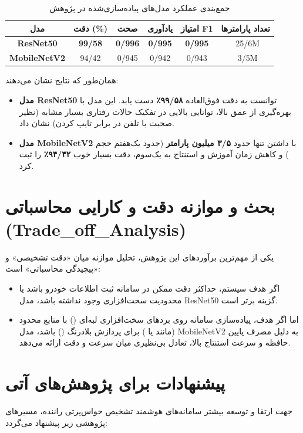 \documentclass{report}
\begin{document}
 			\begin{table}[H]
 				\centering
 				\caption{جمع‌بندی عملکرد مدل‌های پیاده‌سازی‌شده در پژوهش}
 				\label{tab:final_summary}
 				\small
 				\begin{tabular}{cccccc}
 					\toprule
 					\textbf{مدل} & \textbf{دقت (\%)} & \textbf{صحت} & \textbf{یادآوری} & \textbf{امتیاز F1} & \textbf{تعداد پارامترها} \\
 					\midrule
 					\textbf{ResNet50} & \textbf{99/58} & \textbf{0/996} & \textbf{0/995} & \textbf{0/995} & ~25/6M \\
 					\textbf{MobileNetV2} & 94/42 & 0/945 & 0/942 & 0/943 & ~3/5M \\
 					\bottomrule
 				\end{tabular}
 			\end{table}
 			
 			همان‌طور که نتایج نشان می‌دهند:
 			\begin{itemize}
 				\item \textbf{مدل ResNet50} توانست به دقت فوق‌العاده \textbf{۹۹/۵۸٪} دست یابد. این مدل با بهره‌گیری از عمق بالا، توانایی بالایی در تفکیک حالات رفتاری بسیار مشابه (نظیر صحبت با تلفن در برابر تایپ کردن) نشان داد.
 				\item \textbf{مدل MobileNetV2} با داشتن تنها حدود \textbf{۳/۵ میلیون پارامتر} (حدود یک‌هفتم حجم ) و کاهش زمان آموزش و استنتاج به یک‌سوم، دقت بسیار خوب \textbf{۹۴/۴۲٪} را ثبت کرد.
 			\end{itemize}
 			
 			\section{بحث و موازنه دقت و کارایی محاسباتی (Trade\_off\_Analysis)}
 			یکی از مهم‌ترین برآوردهای این پژوهش، تحلیل موازنه میان «دقت تشخیصی» و «پیچیدگی محاسباتی» است:
 			\begin{itemize}
 				\item اگر هدف سیستم، حداکثر دقت ممکن در سامانه ثبت اطلاعات خودرو باشد یا محدودیت سخت‌افزاری وجود نداشته باشد، مدل ResNet50 گزینه برتر است.
 				\item اما اگر هدف، پیاده‌سازی سامانه روی برد‌های سخت‌افزاری لبه‌ای () با منابع محدود (مانند  یا ) برای پردازش بلادرنگ () باشد، مدل MobileNetV2 به دلیل مصرف پایین حافظه و سرعت استنتاج بالا، تعادل بی‌نظیری میان سرعت و دقت ارائه می‌دهد.
 			\end{itemize}
 			
 			\section{پیشنهادات برای پژوهش‌های آتی}
 			جهت ارتقا و توسعه بیشتر سامانه‌های هوشمند تشخیص حواس‌پرتی راننده، مسیرهای پژوهشی زیر پیشنهاد می‌گردد:
 			
\end{document}
